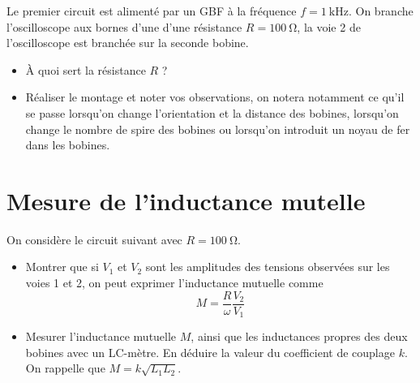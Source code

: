\documentclass{tp}
\begin{document}
\begin{center}
\end{center}
Le premier circuit est alimenté par un GBF à la fréquence $f=\SI{1}{\kilo\hertz}$. On branche l'oscilloscope aux bornes d'une d'une résistance $R=\SI{100}{\ohm}$, la voie 2 de l'oscilloscope est branchée sur la seconde bobine.

\begin{itemize}
  \item À quoi sert la résistance $R$ ?
  \item Réaliser le montage et noter vos observations, on notera notamment ce qu'il se passe lorsqu'on change l'orientation et la distance des bobines, lorsqu'on change le nombre de spire des bobines ou lorsqu'on introduit un noyau de fer dans les bobines.
\end{itemize}

\section{Mesure de l'inductance mutelle}%
\label{sec:mesure_de_l_inductance_mutelle}

On considère le circuit suivant avec $R=\SI{100}{\ohm}$.
\begin{center}
\end{center}

\begin{itemize}
  \item Montrer que si $V_1$ et $V_2$ sont les amplitudes des tensions observées sur les voies 1 et 2, on peut exprimer l'inductance mutuelle comme
  \begin{equation}
    M = \frac{R}{\omega} \frac{V_2}{V_1}
  \end{equation}

  \item Mesurer l'inductance mutuelle $M$, ainsi que les inductances propres des deux bobines avec un LC-mètre. En déduire la valeur du coefficient de couplage $k$. On rappelle que $M = k\sqrt{L_1L_2}$. 
\end{itemize}
\end{document}
